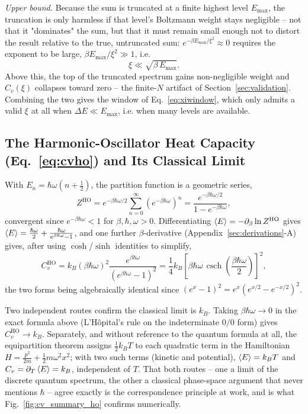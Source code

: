 \documentclass[10pt,conference]{IEEEtran}
\begin{document}
\emph{Upper bound.} Because the sum is truncated at a finite highest level $E_{\max}$, the truncation is only harmless if that level's Boltzmann weight stays negligible -- not that it "dominates" the sum, but that it must remain small enough not to distort the result relative to the true, untruncated sum: $e^{-\beta E_{\max}/\xi^2}\approx0$ requires the exponent to be large, $\beta E_{\max}/\xi^2\gg1$, i.e.
\begin{equation}
\xi \ll \sqrt{\beta\,E_{\max}}.
\end{equation}
Above this, the top of the truncated spectrum gains non-negligible weight and $C_v(\xi)$ collapses toward zero -- the finite-$N$ artifact of Section~\ref{sec:validation}. Combining the two gives the window of Eq.~\eqref{eq:xiwindow}, which only admits a valid $\xi$ at all when $\Delta E\ll E_{\max}$, i.e. when many levels are available.

\subsection{The Harmonic-Oscillator Heat Capacity (Eq.~\ref{eq:cvho}) and Its Classical Limit}
With $E_n=\hbar\omega(n+\tfrac12)$, the partition function is a geometric series,
\begin{equation}
Z^{\text{HO}} = e^{-\beta\hbar\omega/2}\sum_{n=0}^{\infty}\left(e^{-\beta\hbar\omega}\right)^n = \frac{e^{-\beta\hbar\omega/2}}{1-e^{-\beta\hbar\omega}},
\end{equation}
convergent since $e^{-\beta\hbar\omega}<1$ for $\beta,\hbar,\omega>0$. Differentiating $\expval{E}=-\partial_\beta\ln Z^{\text{HO}}$ gives $\expval{E}=\tfrac{\hbar\omega}{2}+\tfrac{\hbar\omega}{e^{\beta\hbar\omega}-1}$, and one further $\beta$-derivative (Appendix~\ref{sec:derivations}-A) gives, after using $\cosh$/$\sinh$ identities to simplify,
\begin{equation}
C_v^{\text{HO}} = k_B(\beta\hbar\omega)^2\frac{e^{\beta\hbar\omega}}{\left(e^{\beta\hbar\omega}-1\right)^2} = \frac14 k_B\left[\beta\hbar\omega\,\operatorname{csch}\!\left(\frac{\beta\hbar\omega}{2}\right)\right]^2,
\end{equation}
the two forms being algebraically identical since $\left(e^{x}-1\right)^2=e^{x}\left(e^{x/2}-e^{-x/2}\right)^2$.

Two independent routes confirm the classical limit is $k_B$. Taking $\beta\hbar\omega\to0$ in the exact formula above (L'H\^opital's rule on the indeterminate $0/0$ form) gives $C_v^{\text{HO}}\to k_B$. Separately, and without reference to the quantum formula at all, the equipartition theorem assigns $\tfrac12 k_BT$ to each quadratic term in the Hamiltonian $H=\tfrac{p^2}{2m}+\tfrac12 m\omega^2x^2$; with two such terms (kinetic and potential), $\expval{E}=k_BT$ and $C_v=\partial_T\expval{E}=k_B$, independent of $T$. That both routes -- one a limit of the discrete quantum spectrum, the other a classical phase-space argument that never mentions $\hbar$ -- agree exactly is the correspondence principle at work, and is what Fig.~\ref{fig:cv_summary_ho} confirms numerically.
\end{document}
